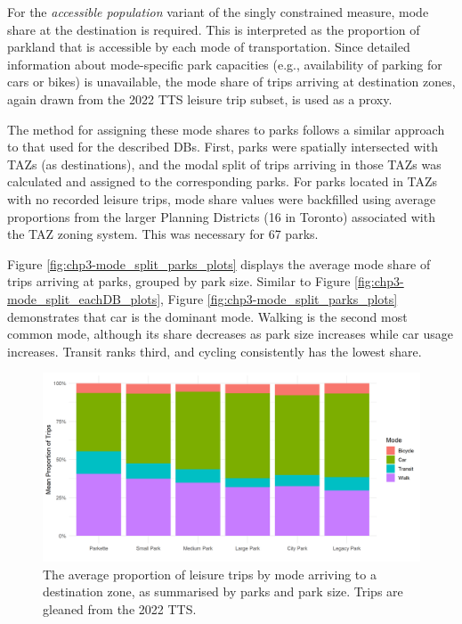\documentclass[
11pt, %
oneside, %
english, %
singlespacing, %
]{macthesis} %
\begin{document}
For the \emph{accessible population} variant of the singly constrained measure, mode share at the destination is required. This is interpreted as the proportion of parkland that is accessible by each mode of transportation. Since detailed information about mode-specific park capacities (e.g., availability of parking for cars or bikes) is unavailable, the mode share of trips arriving at destination zones, again drawn from the 2022 TTS leisure trip subset, is used as a proxy.

The method for assigning these mode shares to parks follows a similar approach to that used for the described DBs. First, parks were spatially intersected with TAZs (as destinations), and the modal split of trips arriving in those TAZs was calculated and assigned to the corresponding parks. For parks located in TAZs with no recorded leisure trips, mode share values were backfilled using average proportions from the larger Planning Districts (16 in Toronto) associated with the TAZ zoning system. This was necessary for 67 parks.

Figure \ref{fig:chp3-mode_split_parks_plots} displays the average mode share of trips arriving at parks, grouped by park size. Similar to Figure \ref{fig:chp3-mode_split_eachDB_plots}, Figure \ref{fig:chp3-mode_split_parks_plots} demonstrates that car is the dominant mode. Walking is the second most common mode, although its share decreases as park size increases while car usage increases. Transit ranks third, and cycling consistently has the lowest share.

\begin{figure}

{\centering \includegraphics[width=6in]{./data/figures/chp3-mode_split_parks_plots} 

}

\caption{\label{fig:chp3-mode_split_parks_plots} The average proportion of leisure trips by mode arriving to a destination zone, as summarised by parks and park size. Trips are gleaned from the 2022 TTS. }\label{fig:unnamed-chunk-52}
\end{figure}
\end{document}
